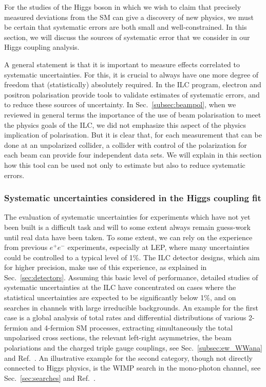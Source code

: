 
  For the studies of the Higgs boson in which we wish to claim that precisely measured deviations from the SM can give a discovery of new physics, we must be certain that systematic errors are both small and well-constrained.  In this section, we will discuss 
the sources of systematic error that we consider in our Higgs coupling analysis.

A general statement is that it is important to measure effects correlated to systematic uncertainties.  For this, it is crucial to always have one more degree of freedom that (statistically) absolutely required.  In the ILC program, electron and positron polarisation
provide tools to validate estimates of systematic errors, and to reduce these 
sources of uncertainty.  In Sec.~\ref{subsec:beampol}, when we reviewed in general terms the importance of the
 use of beam polarisation to meet the physics goals of the ILC, we did not emphasize this 
aspect of the physics implication of polarisation.  But it is clear that, for each measurement that can be done at an unpolarized collider, a collider with control of the polarization for each beam can provide four independent data sets.  We will explain in this section how this tool 
can be used not only to estimate but also to reduce systematic errors.



\subsubsection{Systematic uncertainties considered in the Higgs coupling fit}
\label{subsubsec:sysuncert}
The evaluation of systematic uncertainties for experiments which have not yet been built is a difficult task and will to some extent always remain guess-work until real data have been taken. To some extent, we can rely on the experience from previous $e^+e^-$ experiments, especially at LEP, where many uncertainties could be controlled to a typical level of 1\%.
The ILC detector designs, which aim for higher precision, make use of this experience,
as explained in Sec.~\ref{sec:detectors}.  Assuming this basic level of performance, detailed studies of systematic uncertainties at the ILC have concentrated on cases where the statistical uncertainties are expected to be significantly below 1\%, and on searches in channels with large irreducible backgrounds. An example for the first case is a global analysis of total rates and differential distributions of various 2-fermion and 4-fermion SM processes, extracting simultaneously the total unpolarised cross sections, the relevant left-right asymmetries, the beam polariations and the charged triple gauge couplings, see Sec.~\ref{subsec:ew_WWana} and Ref.~\cite{bib:PhDRobert}. An illustrative example for the second category, though not directly connected to Higgs physics, is the WIMP search in the mono-photon channel, see Sec.~\ref{sec:searches} and Ref.~\cite{Habermehl:417605}. 

